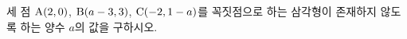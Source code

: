 세 점 $\mathrm{A}(2{,}\mkern3mu\mathopen{}0)$, $\mathrm{B}(a-3{,}\mkern3mu\mathopen{}3)$, $\mathrm{C}(-2{,}\mkern3mu\mathopen{}1-a)$를 꼭짓점으로 하는 삼각형이 존재하지 않도록 하는 양수 $a$의 값을 구하시오.
